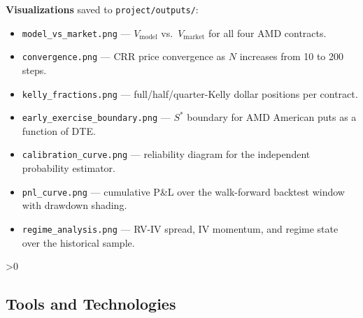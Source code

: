 \documentclass[12pt, letterpaper]{article}
\let\oldsubsection\subsection
\renewcommand{\subsection}{%
  \ifnum\value{subsection}>0 \clearpage\fi
  \oldsubsection
}
\begin{document}
\newpage
\noindent\textbf{Visualizations} saved to \texttt{project/outputs/}:
\begin{itemize}
  \item \texttt{model\_vs\_market.png} ---
        $V_{\text{model}}$ vs.\ $V_{\text{market}}$ for all four
        AMD contracts.
  \item \texttt{convergence.png} --- CRR price convergence as $N$
        increases from 10 to 200 steps.
  \item \texttt{kelly\_fractions.png} --- full/half/quarter-Kelly
        dollar positions per contract.
  \item \texttt{early\_exercise\_boundary.png} --- $S^{*}$
        boundary for AMD American puts as a function of DTE.
  \item \texttt{calibration\_curve.png} --- reliability diagram for
        the independent probability estimator.
  \item \texttt{pnl\_curve.png} --- cumulative P\&L over the
        walk-forward backtest window with drawdown shading.
  \item \texttt{regime\_analysis.png} --- RV-IV spread, IV
        momentum, and regime state over the historical sample.
\end{itemize}

\subsection{Tools and Technologies}
\end{document}
